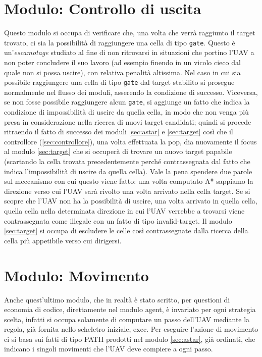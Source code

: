 \section{Modulo: Controllo di uscita} \label{sec:uscita}
Questo modulo si occupa di verificare che, una volta che verrà raggiunto il target trovato, ci sia la possibilità di raggiungere una cella di tipo \texttt{gate}. Questo è un'\emph{escamotage} studiato al fine di non ritrovarsi in situazioni che portino l'UAV a non poter concludere il suo lavoro (ad esempio finendo in un vicolo cieco dal quale non si possa uscire), con relativa penalità altissima.
Nel caso in cui sia possibile raggiungere una cella di tipo \texttt{gate} dal target stabilito si prosegue normalmente nel flusso dei moduli, asserendo la condizione di successo. Viceversa, se non fosse possibile raggiungere alcun \texttt{gate}, si aggiunge un fatto che indica la condizione di impossibilità di uscire da quella cella, in modo che non venga più presa in considerazione nella ricerca di nuovi target candidati; quindi si procede ritraendo il fatto di successo dei moduli \ref{sec:astar} e \ref{sec:target} così che il controllore (\ref{sec:controllore}), una volta effettuata la pop, dia nuovamente il focus al modulo \ref{sec:target} che si occuperà di trovare un nuovo target papabile (scartando la cella trovata precedentemente perché contrassegnata dal fatto che indica l'impossibilità di uscire da quella cella). Vale la pena spendere due parole sul meccanismo con cui questo viene fatto: una volta computato A* sappiamo la direzione verso cui l'UAV sarà rivolto una volta arrivato nella cella target. Se si scopre che l'UAV non ha la possibilità di uscire, una volta arrivato in quella cella, quella cella nella determinata direzione in cui l'UAV verrebbe a trovarsi viene contrassegnata come illegale con un fatto di tipo invalid-target. Il modulo \ref{sec:target} si occupa di escludere le celle così contrassegnate dalla ricerca della cella più appetibile verso cui dirigersi.

\section{Modulo: Movimento} \label{sec:movimento}
Anche quest'ultimo modulo, che in realtà è stato scritto, per questioni di economia di codice, direttamente nel modulo agent, è invariato per ogni strategia scelta, infatti si occupa solamente di computare un passo dell'UAV mediante la regola, già fornita nello scheletro iniziale, exec. Per eseguire l'azione di movimento ci si basa sui fatti di tipo PATH prodotti nel modulo \ref{sec:astar}, già ordinati, che indicano i singoli movimenti che l'UAV deve compiere a ogni passo.
